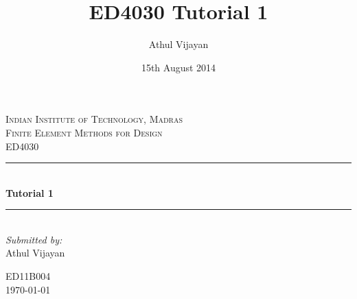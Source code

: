 \documentclass{article}
\title{ED4030 Tutorial 1}
\author{Athul Vijayan}
\date{15th August 2014}
\newcommand{\HRule}{\rule{\linewidth}{0.2mm}} %
\begin{document}
\begin{titlepage}
    \center %
     

    \textsc{\LARGE Indian Institute of Technology, Madras}\\[1.5cm] %
    \textsc{\Large Finite Element Methods for Design}\\[0.5cm] %
    \textsc{\large ED4030}\\[0.5cm] %


    \HRule \\[0.4cm]
    { \huge \bfseries Tutorial 1}\\[0.4cm] %
    \HRule \\[1.5cm]
     

    \Large \emph{Submitted by:}\\
    Athul Vijayan %

    ED11B004\\[8cm] %
    {\large \today}\\[6cm] %
    \vfill %
\end{titlepage}
\end{document}
